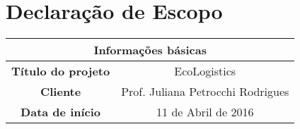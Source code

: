 \chapter{Declaração de Escopo}
  \begin{table}[ht]
    \centering
    \begin{tabular}{| c | c |}
      \hline
      \multicolumn{2}{|c|}{Informações básicas} \\
      \hline
      \textbf{Título do projeto} & EcoLogistics \\
      \hline
      \textbf{Cliente} & Prof. Juliana Petrocchi Rodrigues \\
      \hline
      \textbf{Data de início} & 11 de Abril de 2016 \\
      \hline
    \end{tabular}
  \end{table}

  
  
  
  
